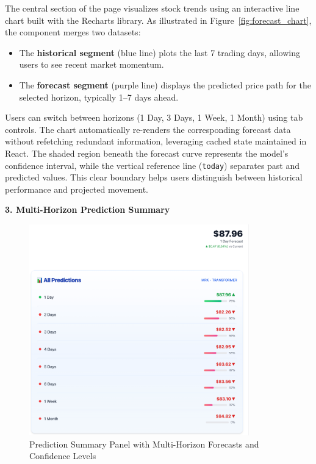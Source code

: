 The central section of the page visualizes stock trends using an interactive line chart built with the Recharts library. As illustrated in Figure~\ref{fig:forecast_chart}, the component merges two datasets:
\begin{itemize}
  \item The \textbf{historical segment} (blue line) plots the last 7 trading days, allowing users to see recent market momentum.
  \item The \textbf{forecast segment} (purple line) displays the predicted price path for the selected horizon, typically 1–7 days ahead.
\end{itemize}

Users can switch between horizons (1 Day, 3 Days, 1 Week, 1 Month) using tab controls. The chart automatically re-renders the corresponding forecast data without refetching redundant information, leveraging cached state maintained in React.  
The shaded region beneath the forecast curve represents the model’s confidence interval, while the vertical reference line (\texttt{today}) separates past and predicted values. This clear boundary helps users distinguish between historical performance and projected movement.

\textbf{3. Multi-Horizon Prediction Summary}

\begin{figure}[h]
\centering
\includegraphics[width=0.85\textwidth]{images/prediction/price.png}
\caption{Prediction Summary Panel with Multi-Horizon Forecasts and Confidence Levels}
\label{fig:forecast_predictions}
\end{figure}

